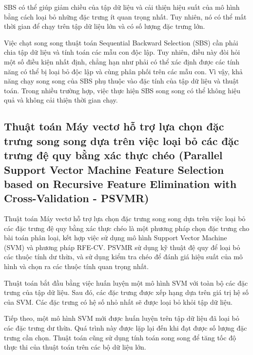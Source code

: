 \begin{itemize}
	SBS có thể giúp giảm chiều của tập dữ liệu và cải thiện hiệu suất của mô hình bằng cách loại bỏ những đặc trưng ít quan trọng nhất. Tuy nhiên, nó có thể mất thời gian để chạy trên tập dữ liệu lớn và có số lượng đặc trưng lớn.
	
	Việc chạt song song thuật toán Sequential Backward Selection (SBS) cần phải chia tập dữ liệu và tính toán các mẫu con độc lập. Tuy nhiên, điều này đòi hỏi một số điều kiện nhất định, chẳng hạn như phải có thể xác định được các tính năng có thể bị loại bỏ độc lập và cùng phân phối trên các mẫu con. Vì vậy, khả năng chạy song song của SBS phụ thuộc vào đặc tính của tập dữ liệu và thuật toán. Trong nhiều trường hợp, việc thực hiện SBS song song có thể không hiệu quả và không cải thiện thời gian chạy.
\end{itemize}

\subsection[PSVMR]{Thuật toán Máy vectơ hỗ trợ lựa chọn đặc trưng song song dựa trên việc loại bỏ các đặc trưng đệ quy bằng xác thực chéo (Parallel Support Vector Machine Feature Selection based on Recursive Feature Elimination with Cross-Validation - PSVMR) \cite{guyon2002gene}}
Thuật toán Máy vectơ hỗ trợ lựa chọn đặc trưng song song dựa trên việc loại bỏ các đặc trưng đệ quy bằng xác thực chéo là một phương pháp chọn đặc trưng cho bài toán phân loại, kết hợp việc sử dụng mô hình Support Vector Machine (SVM) và phương pháp RFE-CV. PSVMR sử dụng kỹ thuật đệ quy để loại bỏ các thuộc tính dư thừa, và sử dụng kiểm tra chéo để đánh giá hiệu suất của mô hình và chọn ra các thuộc tính quan trọng nhất.

Thuật toán bắt đầu bằng việc huấn luyện một mô hình SVM với toàn bộ các đặc trưng của tập dữ liệu. Sau đó, các đặc trưng được xếp hạng dựa trên giá trị hệ số của SVM. Các đặc trưng có hệ số nhỏ nhất sẽ được loại bỏ khỏi tập dữ liệu.

Tiếp theo, một mô hình SVM mới được huấn luyện trên tập dữ liệu đã loại bỏ các đặc trưng dư thừa. Quá trình này được lặp lại đến khi đạt được số lượng đặc trưng cần chọn. Thuật toán cũng sử dụng tính toán song song để tăng tốc độ thực thi của thuật toán trên các bộ dữ liệu lớn.
